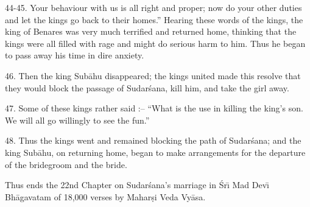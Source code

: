 44-45. Your behaviour with us is all right and proper; now do your other duties and let the kings go back to their homes.'' Hearing these words of the kings, the king of Benares was very much terrified and returned home, thinking that the kings were all filled with rage and might do serious harm to him. Thus he began to pass away his time in dire anxiety.

46. Then the king Sub\=ahu disappeared; the kings united made this resolve that they would block the passage of Sudar\'sana, kill him, and take the girl away.

47. Some of these kings rather said :-- ``What is the use in killing the king's son. We will all go willingly to see the fun.''

48. Thus the kings went and remained blocking the path of Sudar\'sana; and the king Sub\=ahu, on returning home, began to make arrangements for the departure of the bridegroom and the bride.

Thus ends the 22nd Chapter on Sudar\'sana's marriage in \'Sr\={\i} Mad Dev\={\i} Bh\=agavatam of 18,000 verses by Mahar\d{s}i Veda Vy\=asa.



